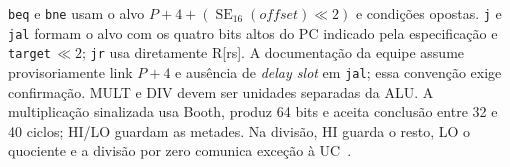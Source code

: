 \texttt{beq} e \texttt{bne} usam o alvo $P+4+(\operatorname{SE}_{16}(\textit{offset})\ll 2)$ e condições opostas. \texttt{j} e \texttt{jal} formam o alvo com os quatro bits altos do PC indicado pela especificação e \texttt{target}\,$\ll 2$; \texttt{jr} usa diretamente R[rs]. A documentação da equipe assume provisoriamente link $P+4$ e ausência de \emph{delay slot} em \texttt{jal}; essa convenção exige confirmação. MULT e DIV devem ser unidades separadas da ALU. A multiplicação sinalizada usa Booth, produz 64 bits e aceita conclusão entre 32 e 40 ciclos; HI/LO guardam as metades. Na divisão, HI guarda o resto, LO o quociente e a divisão por zero comunica exceção à UC~\cite{especificacao}.
